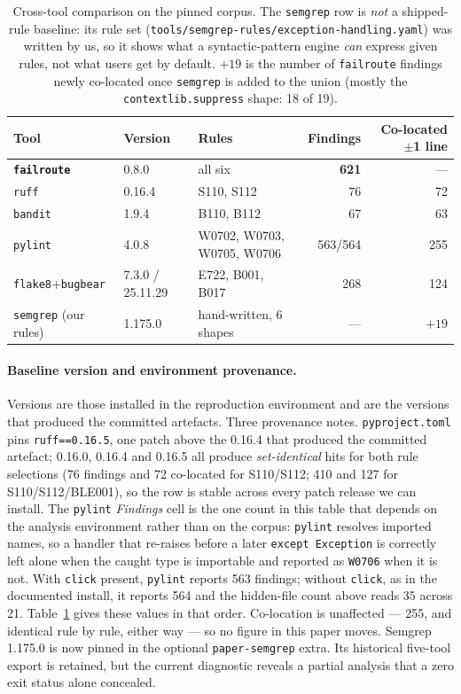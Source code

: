 \documentclass[10pt,a4paper]{article}
\begin{document}
\begin{table}[htbp]
\centering\small
\caption{Cross-tool comparison on the pinned corpus. The \texttt{semgrep} row is
\emph{not} a shipped-rule baseline: its rule set
(\texttt{tools/semgrep-rules/exception-handling.yaml}) was written by us, so it
shows what a syntactic-pattern engine \emph{can} express given rules, not what
users get by default. $+19$ is the number of \texttt{failroute} findings newly
co-located once \texttt{semgrep} is added to the union (mostly the
\texttt{contextlib.suppress} shape: 18 of 19).}
\label{tab:tools}
\begin{tabular}{@{}lllrr@{}}
\toprule
Tool & Version & Rules & Findings & Co-located $\pm$1 line \\
\midrule
\textbf{\texttt{failroute}} & 0.8.0 & all six & \textbf{621} & --- \\
\texttt{ruff} & 0.16.4 & S110, S112 & 76 & 72 \\
\texttt{bandit} & 1.9.4 & B110, B112 & 67 & 63 \\
\texttt{pylint} & 4.0.8 & W0702, W0703, W0705, W0706 & 563/564 & 255 \\
\texttt{flake8}+\texttt{bugbear} & 7.3.0 / 25.11.29 & E722, B001, B017 & 268 & 124 \\
\texttt{semgrep} (our rules) & 1.175.0 & hand-written, 6 shapes & --- & $+19$ \\
\bottomrule
\end{tabular}
\end{table}

\paragraph{Baseline version and environment provenance.}
Versions are those installed in the
reproduction environment and are the versions that produced the committed
artefacts. Three provenance notes. \texttt{pyproject.toml} pins
\texttt{ruff==0.16.5}, one patch above the 0.16.4 that produced the committed
artefact; 0.16.0, 0.16.4 and 0.16.5 all produce \emph{set-identical} hits for both
rule selections (76 findings and 72 co-located for S110/S112; 410 and 127 for
S110/S112/BLE001), so the row is stable across every patch release we can install.
The \texttt{pylint} \emph{Findings} cell is the one count in this table that
depends on the analysis environment rather than on the corpus: \texttt{pylint}
resolves imported names, so a handler that re-raises before a later
\texttt{except Exception} is correctly left alone when the caught type is
importable and reported as \texttt{W0706} when it is not. With \texttt{click}
present, \texttt{pylint} reports 563 findings; without \texttt{click}, as in the
documented install, it reports 564 and the hidden-file count above reads 35 across 21. Table~\ref{tab:tools}
gives these values in that order.
Co-location is unaffected --- 255, and identical rule by rule, either way --- so no
figure in this paper moves. Semgrep 1.175.0 is now pinned in the optional
\texttt{paper-semgrep} extra. Its historical five-tool export is retained,
but the current diagnostic reveals a partial analysis that a zero exit status
alone concealed.
\end{document}
